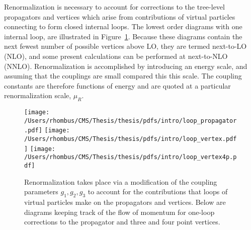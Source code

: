 
 Renormalization is necessary to account
  for corrections to the tree-level propagators
  and vertices which arise from contributions
  of virtual particles connecting to 
  form closed internal loops.
 The lowest order diagrams with
  one internal loop,
  are illustrated in Figure~\ref{fig:oneloopfeyn}.
 Because these diagrams contain the next fewest
  number of possible vertices above LO,
  they are termed next-to-LO (NLO),
  and some present calculations can be 
  performed at next-to-NLO (NNLO).
 Renormalization is accomplished by introducing an energy scale,
  and assuming that the couplings are small compared 
  this this scale. 
 The coupling constants are therefore
  functions of energy 
  and are quoted at a particular renormalization scale,
  $\mu_R$.
 


\begin{figure}[!tb]
 \center
 \caption[One-loop corrections to vertices and propagator]{
  Renormalization takes place via a modification
   of the coupling parameters $g_1,g_2,g_3$ to account
   for the contributions that loops of virtual
   particles make on the propagators and vertices.
  Below are diagrams keeping track of the
   flow of momentum for one-loop corrections to the 
   propagator and three and four point vertices.
 } 
 \texttt{[image: /Users/rhombus/CMS/Thesis/thesis/pdfs/intro/loop\_propagator.pdf]}
 \texttt{[image: /Users/rhombus/CMS/Thesis/thesis/pdfs/intro/loop\_vertex.pdf]}
 \texttt{[image: /Users/rhombus/CMS/Thesis/thesis/pdfs/intro/loop\_vertex4p.pdf]}
    \label{fig:oneloopfeyn}
\end{figure}

